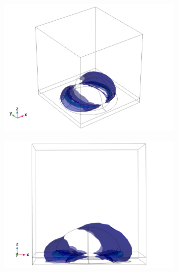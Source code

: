 \begin{figure}[h!]
    \begin{subfigure}{0.32\textwidth}
        \centering
        \includegraphics[width=\linewidth, trim=0.4cm 0 1.5cm 0, clip]{figures/ch4/S6/normE/Sample6_nomE_wl585_phi0_TM.png}
        \caption{}
    \end{subfigure}
    \begin{subfigure}{0.33\textwidth}
        \centering
        \includegraphics[width=\linewidth, trim=0.6cm 0 1.6cm 0, clip]{figures/ch4/S6/normE/Sample6_nomE_wl585_phi0_TM_yawayfromviewer.png}
        \caption{}
    \end{subfigure}
    \begin{subfigure}{0.33\textwidth}

\end{subfigure}
\end{figure}
